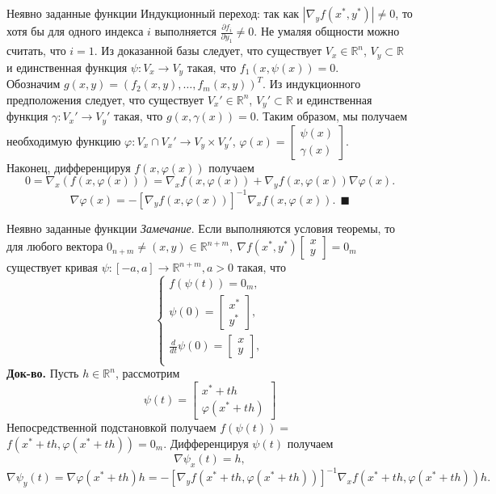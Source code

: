 \documentclass[10pt, handout]{beamer}
\begin{document}
\begin{frame}{Неявно заданные функции}
Индукционный переход: так как $|\nabla_yf(x^*,y^*)|\neq 0$, то хотя бы для одного индекса $i$ выполняется $\frac{\partial f_i}{\partial y_1}\neq 0$. Не умаляя общности можно считать, что $i=1$. Из доказанной базы следует, что существует $V_x\in \mathbb{R}^n$, $V_y\subset \mathbb{R}$ и единственная функция $\psi:V_x\rightarrow V_y$ такая, что $f_1(x, \psi(x))=0$.\\
\vspace{1em}
\pause
Обозначим $g(x, y)=(f_2(x,y), \ldots, f_m(x, y))^T$. Из индукционного предположения следует, что существует $V_x'\in \mathbb{R}^n$, $V_y'\subset \mathbb{R}$ и единственная функция $\gamma:V_x'\rightarrow V_y'$ такая, что $g(x, \gamma(x))=0$. Таким образом, мы получаем необходимую функцию $\varphi:V_x\cap V_x'\rightarrow V_y\times V_y'$, 
$\varphi(x)=\left[\begin{array}{ll}
\psi(x) \\
\gamma(x)
\end{array}\right]$.\\
\vspace{1em}
\pause
Наконец, дифференцируя $f(x, \varphi(x))$ получаем
$$
0=\nabla_x(f(x, \varphi(x)))=\nabla_xf(x, \varphi(x))+\nabla_yf(x,\varphi(x))\nabla\varphi(x).
$$
$$
\nabla\varphi(x)=-[\nabla_yf(x, \varphi(x))]^{-1}\nabla_xf(x,\varphi(x)).~~\blacksquare
$$
\end{frame}

\begin{frame}{Неявно заданные функции}
\textit{Замечание}. Если выполняются условия теоремы, то для любого вектора $0_{n+m}\neq(x, y)\in \mathbb{R}^{n+m},~\nabla f(x^*, y^*)\left[\begin{array}{ll}
x \\ y
\end{array}\right]=0_m$ существует кривая $\psi:[-a, a]\rightarrow \mathbb{R}^{n+m}, a>0$ такая, что
$$
\left\{
\begin{array}{ll}
f(\psi(t))=0_m, \\
\psi(0)=\left[\begin{array}{ll}
x^* \\ y^*
\end{array}\right], \\
\frac{d}{dt}\psi(0)=\left[\begin{array}{ll}
x \\ y
\end{array}\right], \\
\end{array}
\right.
$$
\pause
\textbf{Док-во.} Пусть $h\in \mathbb{R}^n$, рассмотрим
$$
\psi(t)=\left[\begin{array}{ll}
x^*+th \\ \varphi(x^*+th)
\end{array}\right]
$$
Непосредственной подстановкой получаем $f(\psi(t))=$ $f(x^*+th, \varphi(x^*+th))=0_m$.
Дифференцируя $\psi(t)$ получаем
$$
\nabla\psi_x(t)=h,
$$
$$
\nabla\psi_y(t)=\nabla\varphi(x^*+th)h=-[\nabla_yf(x^*+th, \varphi(x^*+th))]^{-1}\nabla_xf(x^*+th,\varphi(x^*+th))h.
$$
\end{frame}
\end{document}
